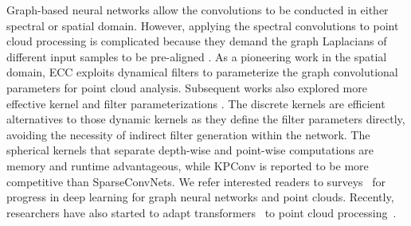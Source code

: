 {Graph-based neural networks allow the
convolutions to be conducted in either spectral or spatial domain. However, applying the spectral convolutions to point cloud processing is complicated because they demand the graph Laplacians of different input samples to be pre-aligned \cite{yi2017syncspeccnn}. 
As a pioneering work in the spatial domain, ECC \cite{simonovsky2017dynamic} exploits dynamical filters \cite{de2016dynamic} to 
parameterize the graph convolutional parameters for point cloud analysis. Subsequent works also explored more effective kernel and filter parameterizations \cite{li2018pointcnn,wang2019attention,wu2019pointconv,du2022novel,huang2022dual}.
The discrete kernels  \cite{lei2019octree,lei2020seggcn,lei2020spherical,thomas2019kpconv} are efficient alternatives to those dynamic kernels as they define the filter parameters directly, avoiding the necessity of indirect filter generation within the network. 
The spherical kernels \cite{lei2020seggcn,lei2020spherical} that separate depth-wise and point-wise computations are memory and runtime advantageous, while KPConv \cite{thomas2019kpconv} is reported to be more competitive than SparseConvNets. 
We refer interested readers to surveys~\cite{wu2020comprehensive, li2020deep} for progress in deep learning for graph neural networks and point clouds. 
Recently, researchers have also started to adapt transformers~\cite{vaswani2017attention} to point cloud processing~\cite{zhao2021point, liu2022uninet, guo2021pct, wu2022point}.}

\vspace{-1mm}
